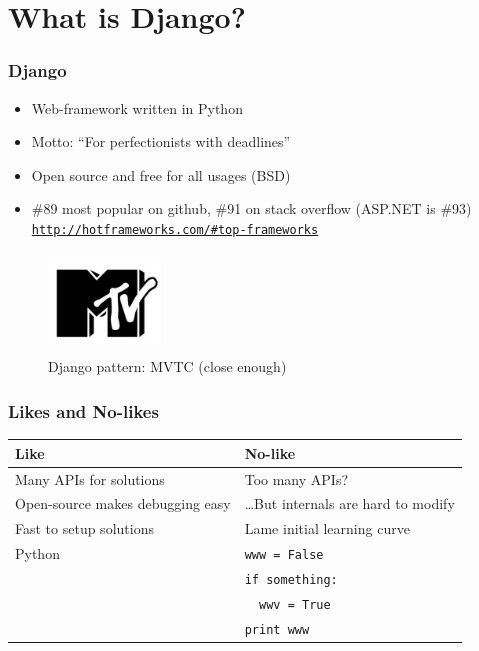 \documentclass[blue]{beamer}
\begin{document}
\section{What is Django?}

\begin{frame}
  \frametitle{Django}   %
  \begin{minipage}{7cm}
    \begin{itemize}
        \item<1> Web-framework written in Python
        \item<1> Motto: ``For perfectionists with deadlines''
        \item<1> Open source and free for all usages (BSD)
        \item<1> \#89 most popular on github, \#91 on stack overflow (ASP.NET is \#93) \\
            \tiny
            \texttt{\url{http://hotframeworks.com/\#top-frameworks}}
            \normalsize
    \end{itemize}
    \end{minipage}%
    \begin{minipage}{4cm}
        \begin{figure}
            \includegraphics[height=2.65cm,width=3cm]{./images/mtv.jpg}
            \caption{Django pattern: MVTC (close enough)}
        \end{figure}
    \end{minipage}
\end{frame}

\small
\begin{frame}
  \frametitle{Likes and No-likes}   %
  \begin{longtable}{l | l}
      \rowcolor{lightblue} Like & No-like \\
      \hline
      Many APIs for solutions & Too many APIs? \\
      \rowcolor{grey}Open-source makes debugging easy & \dots But internals are hard to modify \\
      Fast to setup solutions & Lame initial learning curve \\
      \rowcolor{grey} Python & \texttt{www = False} \\
              \rowcolor{grey} & \texttt{if something:} \\
              \rowcolor{grey} & \texttt{\ \ wwv = True} \\
              \rowcolor{grey} & \texttt{print www} \\
    \end{longtable}
\normalsize
\end{frame}
\end{document}
